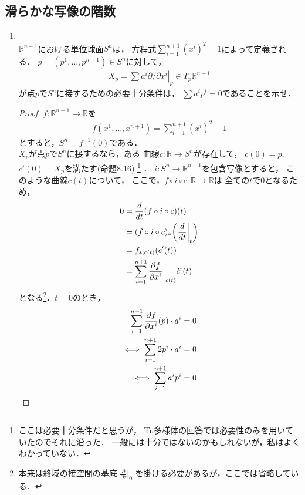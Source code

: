 \documentclass[dvipdfmx,a4paper,11pt]{jsarticle}
\begin{document}
\subsection{滑らかな写像の階数}
\begin{enumerate}
  \item {}\\
  $\mathbb{R}^{n+1}$における単位球面$S^n$は，
  方程式$\sum_{i=1}^{n+1}(x^i)^2=1$によって定義される．
  $p=(p^1,\dots,p^{n+1})\in S^n$に対して，
  \begin{align}
    X_p=\left.\sum a^i\partial/\partial x^i
    \right|_{p}\in T_p\mathbb{R}^{n+1}
  \end{align}
  が点$p$で$S^n$に接するための必要十分条件は，
  $\sum a^i p^i=0$であることを示せ．
  \begin{proof}
    $f\colon\mathbb{R}^{n+1}\to\mathbb{R}$を
    \begin{align}
      f(x^1,\dots,x^{n+1})=\sum_{i=1}^{n+1}(x^i)^2-1
    \end{align}
    とすると，$S^n=f^{-1}(0)$である．\\
    $X_p$が点$p$で$S^n$に接するなら，ある
    曲線$c\colon\mathbb{R}\to S^n$が存在して，
    $c(0)=p$, $c'(0)=X_p$を満たす(命題8.16)
    \footnote{
      ここは必要十分条件だと思うが，
      Tu多様体の回答では必要性のみを用いていたのでそれに沿った．
      一般には十分ではないのかもしれないが，私はよくわかっていない．
    }
    ．
    $i\colon S^n\to\mathbb{R}^{n+1}$を包含写像とすると，
    このような曲線$c(t)$について，
    ここで，$f\circ i\circ c\colon\mathbb{R}\to\mathbb{R}$は
    全ての$t$で0となるため，
    \begin{align}
      0&=\frac{d}{dt}(f\circ i\circ c)(t)\\
      &=(f\circ i\circ c)_*\qty(\frac{d}{dt}\bigg|_{t})\\
      &=f_{*,c(t)}\qty(c'(t))\\
      &=\sum_{i=1}^{n+1}
      \pdv{f}{x^i}\bigg|_{c(t)}\dot{c}^i(t)
    \end{align}
    となる\footnote{
      本来は終域の接空間の基底
      $\frac{\partial}{\partial z}\bigg|_0$
      を掛ける必要があるが，ここでは省略している．
    }．$t=0$のとき，
    \begin{align}
      \sum_{i=1}^{n+1}
      \pdv{f}{x^i}\qty(p)\cdot a^i&=0\\
      \iff
      \sum_{i=1}^{n+1}2p^i\cdot a^i&=0\\
      \iff
      \sum_{i=1}^{n+1}a^ip^i&=0
    \end{align}

\end{proof}
\end{enumerate}
\end{document}
